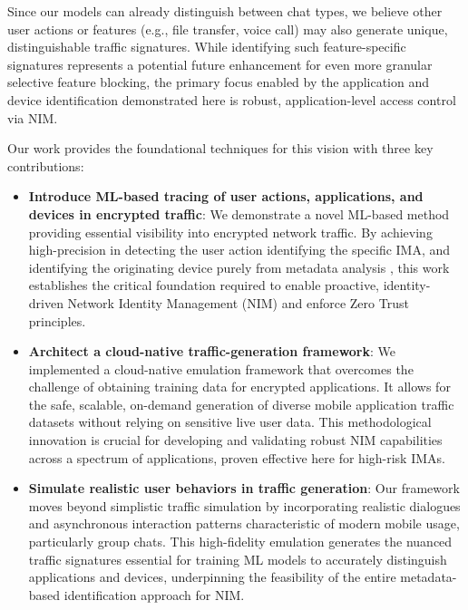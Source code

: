 \documentclass[conference]{IEEEtran}
\begin{document}
Since our models can already distinguish between chat types, we believe other user actions or features (e.g., file transfer, voice call) may also generate unique, distinguishable traffic signatures. While identifying such feature-specific signatures represents a potential future enhancement for even more granular selective feature blocking, the primary focus enabled by the application and device identification demonstrated here is robust, application-level access control via NIM.

Our work provides the foundational techniques for this vision with three key contributions:
\begin{itemize}
    \item \textbf{Introduce ML-based tracing of user actions, applications, and devices in encrypted traffic}: We demonstrate a novel ML-based method providing essential visibility into encrypted network traffic. By achieving high-precision in detecting the user action %
    identifying the specific IMA, and identifying the originating device purely from metadata analysis %
    , this work establishes the critical foundation required to enable proactive, identity-driven Network Identity Management (NIM) and enforce Zero Trust principles.
    \item \textbf{Architect a cloud-native traffic-generation framework}: We implemented a cloud-native emulation framework that overcomes the challenge of obtaining training data for encrypted applications. It allows for the safe, scalable, on-demand generation of diverse mobile application traffic datasets without relying on sensitive live user data. This methodological innovation is crucial for developing and validating robust NIM capabilities across a spectrum of applications, proven effective here for high-risk IMAs.
    \item \textbf{Simulate realistic user behaviors in traffic generation}: Our framework moves beyond simplistic traffic simulation by incorporating realistic dialogues and asynchronous interaction patterns characteristic of modern mobile usage, particularly group chats. This high-fidelity emulation generates the nuanced traffic signatures essential for training ML models to accurately distinguish applications and devices, underpinning the feasibility of the entire metadata-based identification approach for NIM.
\end{itemize}
\end{document}
